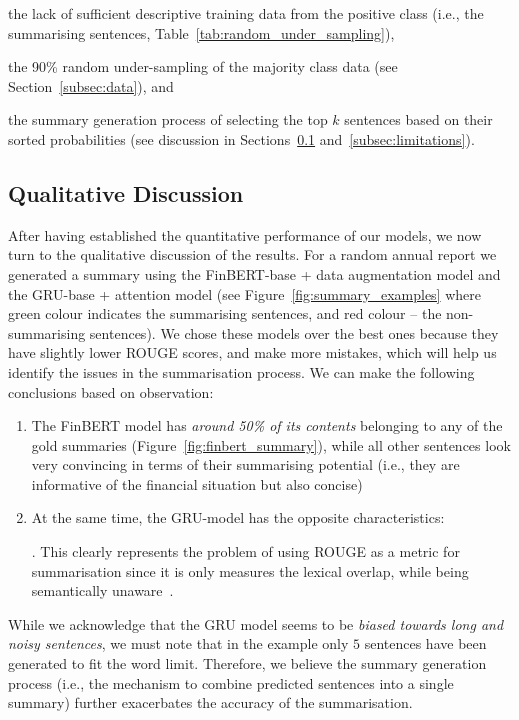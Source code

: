 \begin{itemize}
    \begin{enumerate*}
        \item the lack of sufficient descriptive training data from the positive class (i.e., the summarising sentences, Table~\ref{tab:random_under_sampling}),
        \item the 90\% random under-sampling of the majority class data (see Section~\ref{subsec:data}), and
        \item the summary generation process of selecting the top $k$ sentences based on their sorted probabilities (see discussion in Sections~\ref{subsec:qualitative-discussion} and~\ref{subsec:limitations}).
    \end{enumerate*}
\end{itemize}

\subsection{Qualitative Discussion}\label{subsec:qualitative-discussion}
After having established the quantitative performance of our models, we now turn to the qualitative discussion of the results.
For a random annual report we generated a summary using the FinBERT-base + data augmentation model and
the GRU-base + attention model (see Figure~\ref{fig:summary_examples}
where green colour indicates the summarising sentences, and red colour -- the non-summarising sentences).
We chose these models over the best ones because they have slightly lower ROUGE scores, and make more mistakes, which will help us identify the issues in the summarisation process.
We can make the following conclusions based on observation:
\begin{enumerate}
    \item The FinBERT model has \emph{around 50\% of its contents} belonging to any of the gold summaries (Figure~\ref{fig:finbert_summary}),
        while all other sentences look very convincing in terms of their summarising potential (i.e., they are informative of the financial situation but also concise)
    \item At the same time, the GRU-model has the opposite characteristics:
    .
    This clearly represents the problem of using ROUGE as a metric for summarisation since it is only measures the lexical overlap, while being semantically unaware~\cite{akter-etal-2022-revisiting}.
\end{enumerate}
While we acknowledge that the GRU model seems to be \emph{biased towards long and noisy sentences}, we must note that in the example
only $5$ sentences have been generated to fit the word limit.
Therefore, we believe the summary generation process (i.e., the mechanism to combine predicted sentences into a single summary) further
exacerbates the accuracy of the summarisation.

